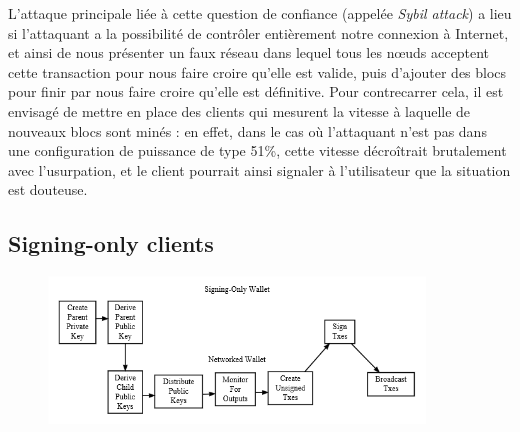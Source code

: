 \documentclass[11pt,a4paper]{article}
\begin{document}
L'attaque principale liée à cette question de confiance (appelée \textit{Sybil attack}) a lieu si l'attaquant a la possibilité de contrôler entièrement notre connexion à Internet, et ainsi de nous présenter un faux réseau dans lequel tous les n\oe{}uds acceptent cette transaction pour nous faire croire qu'elle est valide, puis d'ajouter des blocs pour finir par nous faire croire qu'elle est définitive. Pour contrecarrer cela, il est envisagé de mettre en place des clients qui mesurent la vitesse à laquelle de nouveaux blocs sont minés : en effet, dans le cas où l'attaquant n'est pas dans une configuration de puissance de type 51\%, cette vitesse décroîtrait brutalement avec l'usurpation, et le client pourrait ainsi signaler à l'utilisateur que la situation est douteuse.
\subsection{Signing-only clients}
\begin{figure}[h]
	\includegraphics[width=10cm]{en-wallets-signing-only}
\end{figure}
\end{document}
